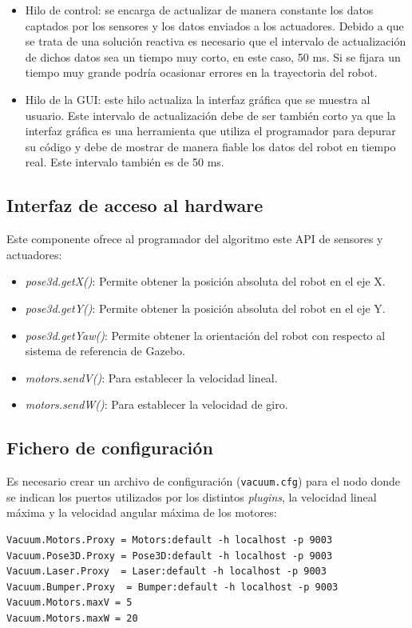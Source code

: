 \begin{itemize}
\item	Hilo de control: se encarga de actualizar de manera constante los datos captados por los sensores y los datos enviados a los actuadores. Debido a que se trata de una solución reactiva es necesario que el intervalo de actualización de dichos datos sea un tiempo muy corto, en este caso, 50 ms. Si se fijara un tiempo muy grande podría ocasionar errores en la trayectoria del robot.
\item	Hilo de la GUI: este hilo actualiza la interfaz gráfica que se muestra al usuario. Este intervalo de actualización debe de ser también corto ya que la interfaz gráfica es una herramienta que utiliza el programador para depurar su código y debe de mostrar de manera fiable los datos del robot en tiempo real. Este intervalo también es de 50 ms.
\end{itemize}


\subsection{Interfaz de acceso al hardware}
Este componente ofrece al programador del algoritmo este API de sensores y actuadores:

\begin{itemize}
\item 	\textit{pose3d.getX()}: Permite obtener la posición absoluta del robot en el eje X.
\item	\textit{pose3d.getY()}: Permite obtener la posición absoluta del robot en el eje Y.
\item	\textit{pose3d.getYaw()}: Permite obtener la orientación del robot con respecto al sistema de referencia de Gazebo.
\item 	\textit{motors.sendV()}: Para establecer la velocidad lineal.
\item	\textit{motors.sendW()}: Para establecer la velocidad de giro.
\end{itemize}

\subsection{Fichero de configuración}
Es necesario crear un archivo de configuración (\texttt{vacuum.cfg}) para el nodo donde se indican los puertos utilizados por los distintos \textit{plugins}, la velocidad lineal máxima y la velocidad angular máxima de los motores:

\vspace{20pt}
	\begin{lstlisting}[frame=single]
Vacuum.Motors.Proxy = Motors:default -h localhost -p 9003
Vacuum.Pose3D.Proxy = Pose3D:default -h localhost -p 9003
Vacuum.Laser.Proxy  = Laser:default -h localhost -p 9003
Vacuum.Bumper.Proxy  = Bumper:default -h localhost -p 9003
Vacuum.Motors.maxV = 5
Vacuum.Motors.maxW = 20
	\end{lstlisting}

